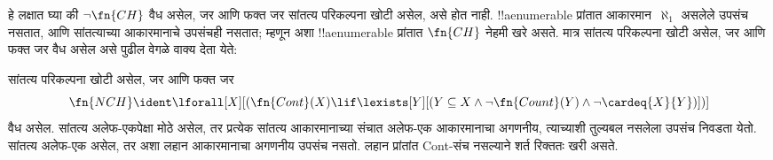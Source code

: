 \documentclass[../../../include/open-logic-section]{subfiles}
\begin{document}
हे लक्षात घ्या की $\lnot \fn{CH}$ वैध असेल,
जर आणि फक्त जर सांतत्य परिकल्पना खोटी असेल,
असे होत नाही. !!a{enumerable} प्रांतात
आकारमान~$\aleph_1$ असलेले उपसंच नसतात,
आणि सांतत्याच्या आकारमानाचे उपसंचही नसतात;
म्हणून अशा !!a{enumerable} प्रांतात
$\fn{CH}$ नेहमी खरे असते. मात्र सांतत्य
परिकल्पना खोटी असेल, जर आणि फक्त जर
वैध असेल असे पुढील वेगळे वाक्य देता येते:

\begin{prop}
सांतत्य परिकल्पना खोटी असेल, जर आणि
फक्त जर \[\fn{NCH} \ident
\lforall[X][(\fn{Cont}(X) \lif \lexists[Y][(Y \subseteq X \land \lnot
    \fn{Count}(Y) \land \lnot \cardeq{X}{Y})])]\]
वैध असेल. सांतत्य अलेफ-एकपेक्षा मोठे असेल, तर
प्रत्येक सांतत्य आकारमानाच्या संचात अलेफ-एक आकारमानाचा
अगणनीय, त्याच्याशी तुल्यबल नसलेला उपसंच निवडता येतो.
सांतत्य अलेफ-एक असेल, तर अशा लहान आकारमानाचा अगणनीय
उपसंच नसतो. लहान प्रांतांत Cont-संच नसल्याने शर्त रिक्ततः खरी असते.
\end{prop}
\end{document}
